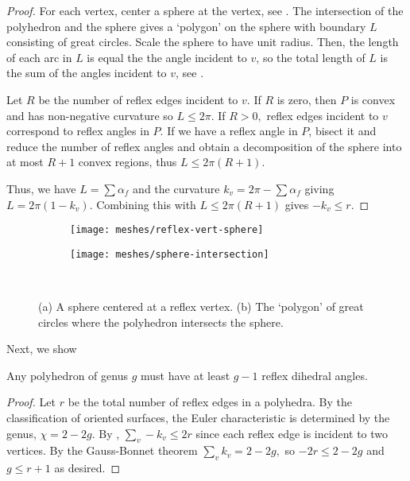 \begin{proof}

For each vertex, center a sphere at the vertex,
see .
The intersection of the polyhedron and the sphere
gives a `polygon' on the sphere with boundary $L$ consisting of great
circles. 
Scale the sphere to have unit radius. Then, the length of each arc
in $L$ is equal the the angle incident to $v$, so the total length of $L$ is
the sum of the angles incident to $v$, see .

Let $R$ be the number of reflex edges incident to $v$.
If $R$ is zero, then $P$ is convex and has non-negative curvature
so $L\leq 2\pi$. If $R>0,$
reflex edges incident to $v$ correspond to reflex angles in $P$.
If we have a reflex angle in $P$, bisect it and reduce the 
number of reflex angles and obtain a decomposition
of the sphere into at most $R+1$ convex regions,
thus $L\leq 2\pi(R+1)$.

Thus, we have $L=\sum \alpha_f$ and the curvature 
$k_v=2\pi-\sum \alpha_f$ giving
$L=2\pi(1-k_v)$. Combining this with $L\leq 2\pi(R+1)$
gives $-k_v\leq r.$


\end{proof}

\begin{figure}[htb]
        \centering
        \begin{subfigure}[b]{0.35\textwidth}
        \texttt{[image: meshes/reflex-vert-sphere]}
        \caption{}
          \label{fig:sphere-on-vert}
        \end{subfigure}
          \hspace{.0cm}
         \begin{subfigure}[b]{0.45\textwidth}
        \texttt{[image: meshes/sphere-intersection]}
        \caption{}
        \label{fig:sphere}
        \end{subfigure}\\
		\caption{(a) A sphere centered at a reflex vertex. (b) The `polygon'
		of great circles where the polyhedron intersects the sphere. 
		\label{fig:sphere}}
\end{figure}


Next, we show
\begin{theorem}\label{thm:reflex}

Any polyhedron of genus $g$ must have 
at least $g-1$ reflex dihedral angles. 

\end{theorem}
\begin{proof}
Let $r$ be the total number of reflex edges in a polyhedra.
By the classification of oriented surfaces, the Euler characteristic 
 is determined by the genus, $\chi=2-2g$.
By , $\sum_v -k_v\leq 2 r$ since each
reflex edge is incident to two vertices.
By the Gauss-Bonnet theorem $\sum_vk_v= 2-2g,$
so $-2r\leq 2-2g$ and $g\leq r+1$ as desired.

\end{proof}

